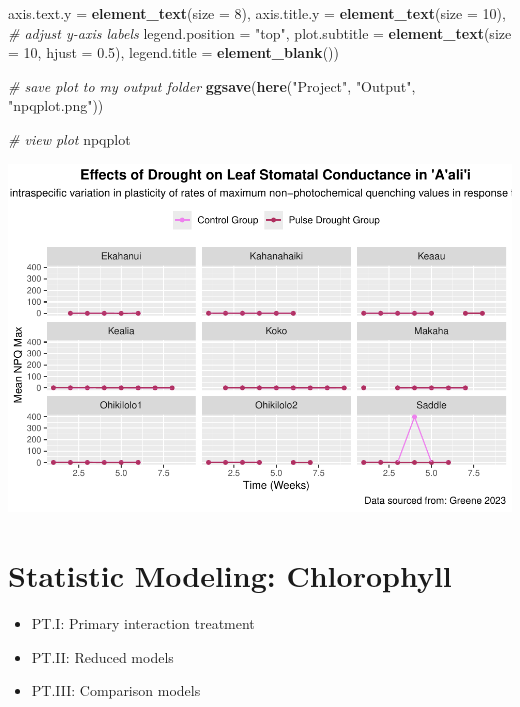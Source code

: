 \documentclass[
]{article}
\newenvironment{Shaded}{\begin{snugshade}}{\end{snugshade}}
\newcommand{\AttributeTok}[1]{\textcolor[rgb]{0.13,0.29,0.53}{#1}}
\newcommand{\CommentTok}[1]{\textcolor[rgb]{0.56,0.35,0.01}{\textit{#1}}}
\newcommand{\DecValTok}[1]{\textcolor[rgb]{0.00,0.00,0.81}{#1}}
\newcommand{\FloatTok}[1]{\textcolor[rgb]{0.00,0.00,0.81}{#1}}
\newcommand{\FunctionTok}[1]{\textcolor[rgb]{0.13,0.29,0.53}{\textbf{#1}}}
\newcommand{\NormalTok}[1]{#1}
\newcommand{\StringTok}[1]{\textcolor[rgb]{0.31,0.60,0.02}{#1}}
\providecommand{\tightlist}{%
  \setlength{\itemsep}{0pt}\setlength{\parskip}{0pt}}
\begin{document}
\begin{Shaded}
\begin{Highlighting}[]
        \AttributeTok{axis.text.y =} \FunctionTok{element\_text}\NormalTok{(}\AttributeTok{size =} \DecValTok{8}\NormalTok{), }\AttributeTok{axis.title.y =} \FunctionTok{element\_text}\NormalTok{(}\AttributeTok{size =} \DecValTok{10}\NormalTok{),   }\CommentTok{\# adjust y{-}axis labels}
        \AttributeTok{legend.position =} \StringTok{"top"}\NormalTok{, }
        \AttributeTok{plot.subtitle =} \FunctionTok{element\_text}\NormalTok{(}\AttributeTok{size =} \DecValTok{10}\NormalTok{, }\AttributeTok{hjust =} \FloatTok{0.5}\NormalTok{), }
        \AttributeTok{legend.title =} \FunctionTok{element\_blank}\NormalTok{())}

\CommentTok{\# save plot to my output folder}
\FunctionTok{ggsave}\NormalTok{(}\FunctionTok{here}\NormalTok{(}\StringTok{"Project"}\NormalTok{, }\StringTok{"Output"}\NormalTok{, }\StringTok{"npqplot.png"}\NormalTok{)) }

\CommentTok{\# view plot}
\NormalTok{npqplot}
\end{Highlighting}
\end{Shaded}

\includegraphics{../Output/unnamed-chunk-4-1.pdf}

\section{Statistic Modeling:
Chlorophyll}\label{statistic-modeling-chlorophyll}

\begin{itemize}
\tightlist
\item
  PT.I: Primary interaction treatment\\
\item
  PT.II: Reduced models\\
\item
  PT.III: Comparison models
\end{itemize}
\end{document}
